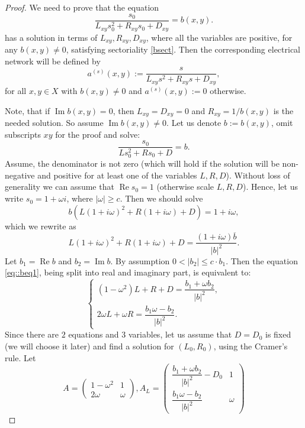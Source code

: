 \documentclass[a4paper,11pt]{amsart}
\theoremstyle{definition}
\renewcommand{\a}{a}%
\renewcommand{\Re}{\operatorname{Re}}%
\renewcommand{\Im}{\operatorname{Im}}%
\newcommand{\cfreq}{s}
\begin{document}
\begin{proof}
 We need to prove that the equation 
\begin{equation*}
\dfrac{\cfreq_0}{L_{xy}\cfreq_0^2+R_{xy}\cfreq_0+D_{xy}}=b(x,y).
\end{equation*}
 has a solution in terms of $L_{xy},R_{xy}, D_{xy}$, where all the variables are positive, for any $b(x,y)\ne 0$, satisfying sectoriality \eqref{bsect}. Then the corresponding electrical network will be defined by
 $$
\a^{(\cfreq)}(x,y):= \dfrac{\cfreq}{L_{xy}\cfreq^2+R_{xy}\cfreq+D_{xy}},
 $$
 for all $x,y\in X$ with $b(x,y)\ne 0$ and $\a^{(\cfreq)}(x,y):=0$ otherwise.
 
 Note, that if $\Im b(x,y)=0$, then $L_{xy}=D_{xy}=0$ and $R_{xy}=1/b(x,y)$ is the needed solution. So assume $\Im b(x,y)\ne 0$. Let us denote $b:=b(x,y)$, omit subscripts ${xy}$ for the proof and solve:
$$
\dfrac{\cfreq_0}{L\cfreq_0^2+R\cfreq_0+D}=b.
$$
Assume, the denominator is not zero (which will hold if the solution will be non-negative and positive for at least one of the variables $L,R,D$). Without loss of generality we can assume that $\Re \cfreq_0=1$ (otherwise scale $L,R,D$). Hence, let us write $\cfreq_0=1+\omega i$, where $|\omega|\ge c$. Then we should solve
\begin{equation*}
b(L(1+i\omega)^2+R(1+i\omega)+D)={1+i\omega},
\end{equation*}
which we rewrite as
\begin{equation}\label{eq::beq1}
L(1+i\omega)^2+R(1+i\omega)+D=\dfrac{{(1+i\omega)}\overline b}{|b|^2}.
\end{equation}
Let $b_1=\Re b$ and $b_2=\Im b$. By assumption $0<|b_2|\le c\cdot b_1$. Then the equation \eqref{eq::beq1}, being split into real and imaginary part, is equivalent to:
$$
\begin{cases}
(1-\omega^2)L+R+D=\dfrac{b_1+\omega b_2}{|b|^2},\\
2\omega L+\omega R=\dfrac{b_1\omega - b_2}{|b|^2}.
\end{cases}
$$
Since there are $2$ equations and $3$ variables, let us assume that $D=D_0$ is fixed (we will choose it later) and find a solution for $(L_0, R_0)$, using the Cramer's rule. Let
$$
A=\begin{pmatrix}
1-\omega^2&1\\
2\omega&\omega
\end{pmatrix},
A_L=
\begin{pmatrix}
\dfrac{b_1+\omega b_2}{|b|^2}-D_0&1\\
\dfrac{b_1\omega - b_2}{|b|^2}&\omega

\end{pmatrix}$$
\end{proof}
\end{document}
